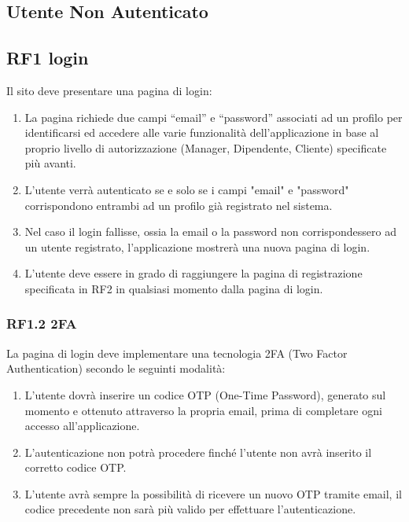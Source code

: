 \documentclass{report}
\begin{document}
\subsection{Utente Non Autenticato}

\subsection*{RF1 login}
Il sito deve presentare una pagina di login:
\begin{enumerate}
	\item La pagina richiede due campi “email” e “password” associati ad un profilo per identificarsi ed accedere alle varie funzionalità dell’applicazione in base al proprio livello di autorizzazione (Manager, Dipendente, Cliente) specificate più avanti.
	
	\item L'utente verrà autenticato se e solo se i campi "email" e "password" corrispondono entrambi ad un profilo già registrato nel sistema.
	
	\item Nel caso il login fallisse, ossia la email o la password non corrispondessero ad un utente registrato, l’applicazione mostrerà una nuova pagina di login.
	
	\item L’utente deve essere in grado di raggiungere la pagina di registrazione specificata in RF2 in qualsiasi momento dalla pagina di login.
	
\end{enumerate}

	\subsubsection{RF1.2 2FA}
	La pagina di login deve implementare una tecnologia 2FA (Two Factor Authentication) secondo le seguinti modalità:
	
	\begin{enumerate}
	\item L’utente dovrà inserire un codice OTP (One-Time Password), generato sul momento e ottenuto attraverso la propria email, prima di completare ogni accesso all’applicazione. 
	
	\item 	L’autenticazione non potrà procedere finché l’utente non avrà inserito il corretto codice OTP.
	
	\item L’utente avrà sempre la possibilità di ricevere un nuovo OTP tramite email, il codice precedente non sarà più valido per effettuare l’autenticazione.

	\end{enumerate}
	
\end{document}
